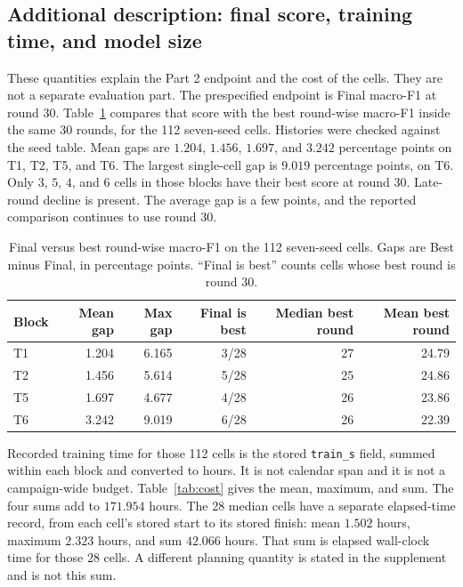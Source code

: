 \documentclass{ieeeaccess}
\begin{document}
\subsection{Additional description: final score, training time, and model size}
These quantities explain the Part 2 endpoint and the cost of the cells. They are not a separate evaluation part. The prespecified endpoint is Final macro-F1 at round 30. Table~\ref{tab:gap} compares that score with the best round-wise macro-F1 inside the same 30 rounds, for the 112 seven-seed cells. Histories were checked against the seed table. Mean gaps are $1.204$, $1.456$, $1.697$, and $3.242$ percentage points on T1, T2, T5, and T6. The largest single-cell gap is $9.019$ percentage points, on T6. Only $3$, $5$, $4$, and $6$ cells in those blocks have their best score at round 30. Late-round decline is present. The average gap is a few points, and the reported comparison continues to use round 30.

\begin{table}[!t]
\centering
\caption{Final versus best round-wise macro-F1 on the 112 seven-seed cells. Gaps are Best minus Final, in percentage points. ``Final is best'' counts cells whose best round is round 30.}
\label{tab:gap}
\small
\begin{tabular}{lrrrrr}
\hline
Block & Mean gap & Max gap & Final is best & Median best round & Mean best round \\
\hline
T1 & 1.204 & 6.165 & 3/28 & 27 & 24.79 \\
T2 & 1.456 & 5.614 & 5/28 & 25 & 24.86 \\
T5 & 1.697 & 4.677 & 4/28 & 26 & 23.86 \\
T6 & 3.242 & 9.019 & 6/28 & 26 & 22.39 \\
\hline
\end{tabular}
\end{table}

Recorded training time for those 112 cells is the stored \texttt{train\_s} field, summed within each block and converted to hours. It is not calendar span and it is not a campaign-wide budget. Table~\ref{tab:cost} gives the mean, maximum, and sum. The four sums add to $171.954$ hours. The 28 median cells have a separate elapsed-time record, from each cell's stored start to its stored finish: mean $1.502$ hours, maximum $2.323$ hours, and sum $42.066$ hours. That sum is elapsed wall-clock time for those 28 cells. A different planning quantity is stated in the supplement and is not this sum.
\end{document}
